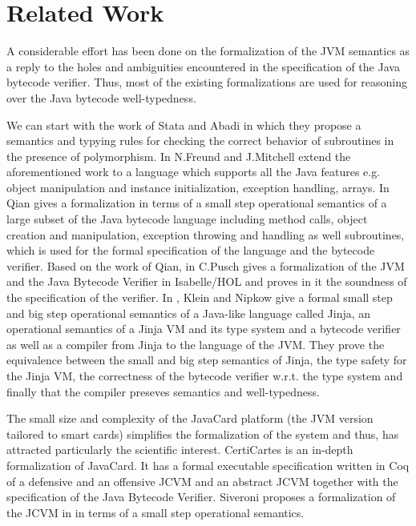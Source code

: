 \section{Related Work}\label{relWork}
 A considerable effort has been done on the formalization of 
 the JVM semantics as a reply to the holes and ambiguities encountered in
 the specification of the Java bytecode verifier. 
 Thus,  most of the existing formalizations are
 used for reasoning over the Java bytecode well-typedness.
 
 We can start with the work of Stata and Abadi \cite{stata98type} in which they propose a semantics  and 
  typying rules for checking the correct behavior of  subroutines in the presence of polymorphism.
 In \cite{FM99FFJ}  N.Freund and J.Mitchell extend the aforementioned work to 
 a language which supports all the Java features e.g.
 object manipulation and instance initialization, exception handling, arrays.
 In \cite{qian99formal}  Qian  gives a formalization in terms of a small step operational semantics of a
 large subset of the Java bytecode language including method calls, object creation and manipulation,
 exception throwing and handling as well subroutines, which is used for the formal specification of the language and the bytecode verifier.
 Based on the work of Qian, in \cite{pusch98proving} C.Pusch gives a formalization of the JVM and the Java Bytecode Verifier
 in Isabelle/HOL and proves in it the soundness of the specification of the verifier.
 In \cite{KleinN04}, Klein and Nipkow give a formal small step and big step operational
 semantics of a Java-like language called Jinja, an operational semantics of a Jinja VM and its type system and a bytecode verifier as well as 
 a compiler from Jinja to the language of the JVM. They prove the equivalence between the small and big step
 semantics of Jinja, the  type safety for the Jinja VM, the correctness of the bytecode verifier w.r.t. the type system
 and finally that the compiler preseves semantics and well-typedness.
  

  The small size and complexity of the JavaCard platform (the JVM version tailored to smart cards) 
 simplifies the formalization of the system and thus,
 has attracted  particularly the scientific interest. CertiCartes \cite{barthe01formal,barthe02formal}
 is an in-depth formalization of JavaCard. It has a formal executable
 specification written in Coq of a defensive and an offensive JCVM and an abstract JCVM together with the specification
 of the Java Bytecode Verifier.  Siveroni proposes a formalization of the JCVM in \cite{siveroni04operational} in terms of
 a small step operational semantics. 


